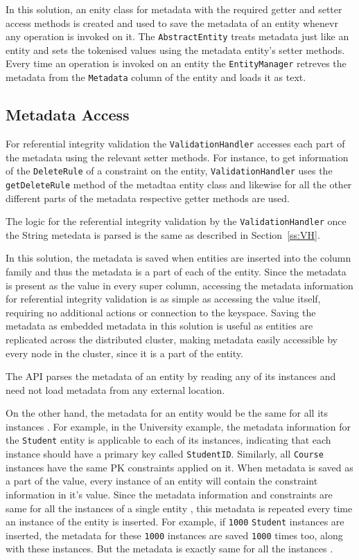 	In this solution, an enity class for metadata with the required getter and
	setter access methods is created and used to save the metadata of an entity
	whenevr any operation is invoked on it.
	The \texttt{AbstractEntity} treats metadata just like an entity and sets the
	tokenised values using the metadata entity's setter methods.
	Every time an operation is invoked on an entity the \texttt{EntityManager}
	retreves the metadata from the \texttt{Metadata} column of the entity and loads
	it as text.
		 
	 
	 
\subsection{Metadata Access}
	  
 For referential integrity validation the
	 \texttt{ValidationHandler} accesses each part of the metadata using the
	 relevant setter methods. For instance, to get information of
	the \texttt{DeleteRule} of a constraint on the entity,
	\texttt{ValidationHandler} uses the \texttt{getDeleteRule} method of the
	metadtaa entity class and likewise for all the other different parts
	of the metadata respective getter methods are used.
	 
	 The logic for the referential
	 integrity validation by the \texttt{ValidationHandler} once the String metedata is parsed is the same as described in Section~\ref{ss:VH}.

	In this solution, the metadata is saved  when entities are inserted into the
	column family and thus the metadata is a part of each of the entity.  Since the
	metadata is present as the value in every super column,  accessing the metadata
	information for referential integrity validation is as simple as accessing the
	value itself,  requiring no additional actions or connection to the
	keyspace. Saving the metadata as embedded metadata in this solution is useful
	as entities are replicated across the distributed cluster, making metadata
	easily accessible by every node in the cluster, since it is a part of the
	entity.

	The \ac{API} parses the metadata of an entity by reading any of its
	instances and need not load metadata from any external location.

	On the other hand,  the metadata for an entity would be the same for all its
	instances .  For example,  in the University example,  the metadata
	information for the \texttt{Student} entity is applicable to each of its
	instances,  indicating that each instance  should have a primary key called
	\texttt{StudentID}.
	Similarly,  all \texttt{Course} instances have the same \ac{PK} constraints
	applied on it.  When metadata is saved as a part of the  value,
	every instance of an entity will contain the constraint information
	in it's value.  Since the metadata information and constraints are same for all
	the instances of a single entity ,  this metadata is repeated every time an
	instance of the entity is inserted.  For example,  if
	\texttt{1000} \texttt{Student} instances are inserted,  the metadata for these
	\texttt{1000} instances are saved \texttt{1000} times too, along with these
	instances.  But the metadata is exactly same for all the
	instances .



